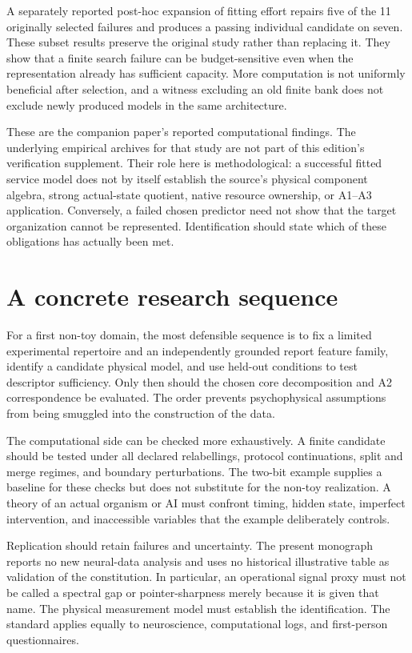 A separately reported post-hoc expansion of fitting effort repairs five of the 11 originally selected failures and produces a passing individual candidate on seven. These subset results preserve the original study rather than replacing it. They show that a finite search failure can be budget-sensitive even when the representation already has sufficient capacity. More computation is not uniformly beneficial after selection, and a witness excluding an old finite bank does not exclude newly produced models in the same architecture.

These are the companion paper's reported computational findings. The underlying empirical archives for that study are not part of this edition's verification supplement. Their role here is methodological: a successful fitted service model does not by itself establish the source's physical component algebra, strong actual-state quotient, native resource ownership, or A1--A3 application. Conversely, a failed chosen predictor need not show that the target organization cannot be represented. Identification should state which of these obligations has actually been met.

\section{A concrete research sequence}\label{section:evidence:a-concrete-research-sequence}
For a first non-toy domain, the most defensible sequence is to fix a limited experimental repertoire and an independently grounded report feature family, identify a candidate physical model, and use held-out conditions to test descriptor sufficiency. Only then should the chosen core decomposition and A2 correspondence be evaluated. The order prevents psychophysical assumptions from being smuggled into the construction of the data.

The computational side can be checked more exhaustively. A finite candidate should be tested under all declared relabellings, protocol continuations, split and merge regimes, and boundary perturbations. The two-bit example supplies a baseline for these checks but does not substitute for the non-toy realization. A theory of an actual organism or AI must confront timing, hidden state, imperfect intervention, and inaccessible variables that the example deliberately controls.

Replication should retain failures and uncertainty. The present monograph reports no new neural-data analysis and uses no historical illustrative table as validation of the constitution. In particular, an operational signal proxy must not be called a spectral gap or pointer-sharpness merely because it is given that name. The physical measurement model must establish the identification. The standard applies equally to neuroscience, computational logs, and first-person questionnaires.


